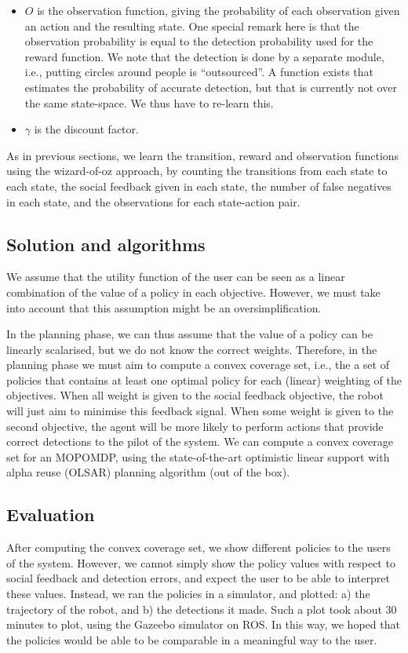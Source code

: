 \documentclass[a4paper,11pt]{report}
\begin{document}
\begin{itemize}
\item $O$ is the observation function, giving the probability of each observation given an action and the resulting state. One special remark here is that the observation probability is equal to the detection probability used for the reward function. We note that the detection is done by a separate module, i.e., putting circles around people is ``outsourced''. A function exists that estimates the probability of accurate detection, but that is currently not over the same state-space. We thus have to re-learn this. 
\item $\gamma$ is the discount factor. 
\end{itemize}

As in previous sections, we learn the transition, reward and observation functions using the wizard-of-oz approach, by counting the transitions from each state to each state, the social feedback given in each state, the number of false negatives in each state, and the observations for each state-action pair. 

\subsection{Solution and algorithms}
We assume that the utility function of the user can be seen as a linear combination of the value of a policy in each objective. However, we must take into account that this assumption might be an oversimplification. 

In the planning phase, we can thus assume that the value of a policy can be linearly scalarised, but we do not know the correct weights. Therefore, in the planning phase we must aim to compute a convex coverage set, i.e., the a set of policies that contains at least one optimal policy for each (linear) weighting of the objectives.  When all weight is given to the social feedback objective, the robot will just aim to minimise this feedback signal. When some weight is given to the second objective, the agent will be more likely to perform actions that provide correct detections to the pilot of the system.  
We can compute a convex coverage set for an MOPOMDP, using the state-of-the-art optimistic linear support with alpha reuse (OLSAR) planning algorithm (out of the box).  

\subsection{Evaluation}
After computing the convex coverage set, we show different policies to the users of the system. However, we cannot simply show the policy values with respect to social feedback and detection errors, and expect the user to be able to interpret these values. Instead, we ran the policies in a simulator, and plotted: a) the trajectory of the robot, and b) the detections it made. Such a plot took about 30 minutes to plot, using the Gazeebo simulator on ROS. In this way, we hoped that the policies would be able to be comparable in a meaningful way to the user. 
\end{document}
